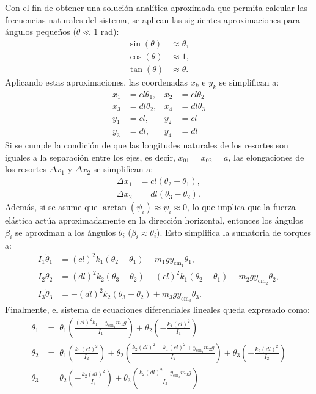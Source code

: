 Con el fin de obtener una soluci\'on anal\'itica aproximada que permita
calcular las frecuencias naturales del sistema, se aplican
las siguientes aproximaciones para \'angulos peque\~nos ($\theta \ll 1$ rad):
\begin{align*}
  \sin(\theta) &\approx \theta, \\
  \cos(\theta) &\approx 1, \\
  \tan(\theta) &\approx \theta.
\end{align*}
Aplicando estas aproximaciones, las coordenadas $x_k$ e $y_k$ se
simplifican a:
\begin{align*}
  x_1 &= c l \theta_1, & x_2 &= c l \theta_2 \\
  x_3 &= d l \theta_2, & x_4 &= d l \theta_3 \\
  y_1 &= c l, & y_2 &= c l \\
  y_3 &= d l, & y_4 &= d l
\end{align*}
Si se cumple la condici\'on de que las longitudes naturales de los
resortes son iguales a la separaci\'on entre los ejes, es decir,
$x_{01} = x_{02} = a$, las elongaciones de los resortes $\Delta x_1$
y $\Delta x_2$ se simplifican a:
\begin{align}
  \Delta x_1 &= cl(\theta_2 - \theta_1) \label{eq:deltax1_approx}, \\
  \Delta x_2 &= dl(\theta_3 - \theta_2) \label{eq:deltax2_approx}.
\end{align}
Adem\'as, si se asume que $\arctan(\psi_i) \approx \psi_i \approx 0$,
lo que implica que la fuerza el\'astica act\'ua aproximadamente en
la direcci\'on horizontal, entonces los \'angulos $\beta_i$ se
aproximan a los \'angulos $\theta_i$ ($\beta_i \approx \theta_i$).
Esto simplifica la sumatoria de torques a:
\begin{align}
  I_1 \ddot{\theta}_1 &= (cl)^2 k_1 (\theta_2 - \theta_1) - m_1 g y_{\text{cm}_1} \theta_1 \label{eq:eq_mov_lin1}, \\
  I_2 \ddot{\theta}_2 &= (dl)^2 k_2 (\theta_3 - \theta_2) - (cl)^2 k_1 (\theta_2 - \theta_1) - m_2 g y_{\text{cm}_2} \theta_2 \label{eq:eq_mov_lin2}, \\
  I_3 \ddot{\theta}_3 &= -(dl)^2 k_2 (\theta_3 - \theta_2) + m_3 g y_{\text{cm}_3} \theta_3 \label{eq:eq_mov_lin3}.
\end{align}
Finalmente, el sistema de ecuaciones diferenciales lineales queda
expresado como:
\begin{align}
  \ddot{\theta}_1 &=\; \theta_1 \left( \frac{(cl)^2 k_{1} - y_{\text{cm}_1} m_1 g}{I_1} \right) + \theta_2 \left( -\frac{k_1 (cl)^2}{I_1} \right) \label{eq:eom1} \\
  \ddot{\theta}_2 &=\; \theta_1 \left( \frac{k_1 (cl)^2}{I_2} \right) + \theta_2 \left( \frac{k_2 (dl)^2 - k_1 (cl)^2 + y_{\text{cm}_2} m_2 g}{I_2} \right) + \theta_3 \left( -\frac{k_2 (dl)^2}{I_2} \right) \label{eq:eom2} \\
  \ddot{\theta}_3 &=\; \theta_2 \left( -\frac{k_2 (dl)^2}{I_3} \right) + \theta_3 \left( \frac{k_2 (dl)^2 - y_{\text{cm}_3} m_3 g}{I_3} \right) \label{eq:eom3}
\end{align}
